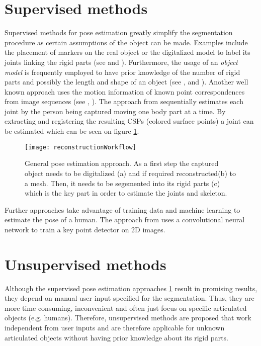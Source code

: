 \section{Supervised methods}
\label{supervised}

Supervised methods for pose estimation greatly simplify the segmentation procedure as certain assumptions of the object can be made. Examples include the placement of markers on the real object or the digitalized model to label its joints linking the rigid parts (see \cite{hierarchicalMethod} and \cite{estimatingConfigurations}). Furthermore, the usage of an \textit{object model} is frequently employed to have prior knowledge of the number of rigid parts and possibly the length and shape of an object (see \cite{multiLayerSkeleton}, \cite{hierarchicalMethod} and \cite{mocapShapeFitting}). Another well known approach uses the motion information of known point correspondences from image sequences (see \cite{segmentationMotion}, \cite{animatedObjects}). The approach from \cite{sfsMocap} sequentially estimates each joint by the person being captured moving one body part at a time. By extracting and registering the resulting CSPs (colored surface points) a joint can be estimated which can be seen on figure \ref{fig:supervisedMotion}. 



\begin{figure}[H]
	\centering
	\texttt{[image: reconstructionWorkflow]}
	\caption{General pose estimation approach. As a first step the captured object needs to be digitalized (a) and if required reconstructed(b) to a mesh. Then, it needs to be segemented into its rigid parts (c) which is the key part in order to estimate the joints and skeleton.}
	\label{fig:supervisedMotion}
\end{figure}
Further approaches take advantage of training data and machine learning to estimate the pose of a human. The approach from \cite{consensusvoting} uses a convolutional neural network to train a key point detector on 2D images. 

\section{Unsupervised methods}
\label{unsupervised}

Although the supervised pose estimation approaches \ref{supervised} result in promising results, they depend on manual user input specified for the segmentation. Thus, they are more time consuming, inconvenient and often just focus on specific articulated objects (e.g. humans). Therefore, unsupervised methods are proposed that work independent from user inputs and are therefore applicable for unknown articulated objects without having prior knowledge about its rigid parts.
